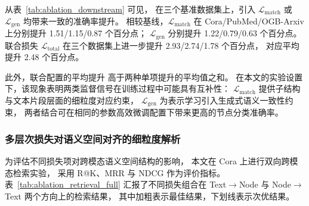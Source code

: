 从表~\ref{tab:ablation_downstream} 可见，
在三个基准数据集上，引入 $\mathcal{L}_{\mathrm{match}}$ 
或 $\mathcal{L}_{\mathrm{gen}}$ 均带来一致的准确率提升。
相较基线，$\mathcal{L}_{\mathrm{match}}$ 在 
Cora/PubMed/OGB-Arxiv 上分别提升 1.51/1.15/0.87 个百分点；
$\mathcal{L}_{\mathrm{gen}}$ 分别提升 1.22/0.79/0.63 个百分点。
联合损失 $\mathcal{L}_{\mathrm{total}}$ 
在三个数据集上进一步提升 2.93/2.74/1.78 个百分点，
对应平均提升 2.48 个百分点。

此外，联合配置的平均提升
高于两种单项提升的平均值之和。
在本文的实验设置下，该现象表明两类监督信号在训练过程中可能具有互补性：
$\mathcal{L}_{\mathrm{match}}$ 提供子结构与文本片段层面的细粒度对应约束，
$\mathcal{L}_{\mathrm{gen}}$ 为表示学习引入生成式语义一致性约束，
两者结合可在相同的参数高效微调配置下带来更高的节点分类准确率。

\subsubsection{多层次损失对语义空间对齐的细粒度解析}

为评估不同损失项对跨模态语义空间结构的影响，
本文在 Cora 上进行双向跨模态检索实验，
采用 R@K、MRR 与 NDCG 作为评价指标。
表~\ref{tab:ablation_retrieval_full} 
汇报了不同损失组合在 Text$\rightarrow$Node 
与 Node$\rightarrow$Text 两个方向上的检索结果，
其中加粗表示最佳结果，下划线表示次优结果。

\begin{table}[htbp]
  \centering
  \caption{图结构和文本的跨模态对齐损失函数的跨模态检索性能测评}
  \label{tab:ablation_retrieval_full}
\end{table}



